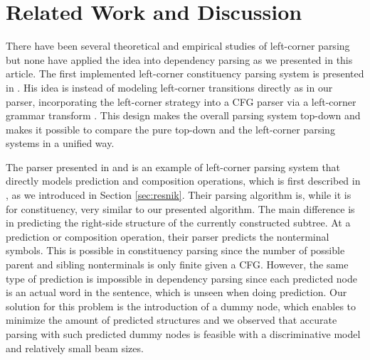 \documentclass[english]{jnlp_1.4}
\begin{document}
\section{Related Work and Discussion}
\label{sec:relatedwork}

There have been several theoretical and empirical studies of left-corner parsing but none have applied the idea into dependency parsing as we presented in this article.
The first implemented left-corner constituency parsing system is presented in .
His idea is instead of modeling left-corner transitions directly as in our parser, incorporating the left-corner strategy into a CFG parser via a left-corner grammar transform \cite{conf/acl/Johnson98}.
This design makes the overall parsing system top-down and makes it possible to compare the pure top-down and the left-corner parsing systems in a unified way.

The parser presented in  and  is an example of left-corner parsing system that directly models prediction and composition operations, which is first described in , as we introduced in Section \ref{sec:resnik}.
Their parsing algorithm is, while it is for constituency, very similar to our presented algorithm.
The main difference is in predicting the right-side structure of the currently constructed subtree.
At a prediction or composition operation, their parser predicts the nonterminal symbols.
This is possible in constituency parsing since the number of possible parent and sibling nonterminals is only finite given a CFG.
However, the same type of prediction is impossible in dependency parsing since each predicted node is an actual word in the sentence, which is unseen when doing prediction.
Our solution for this problem is the introduction of a dummy node, which enables to minimize the amount of predicted structures and we observed that accurate parsing with such predicted dummy nodes is feasible with a discriminative model and relatively small beam sizes.
\end{document}
